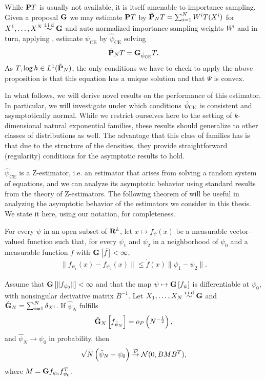 While $\P T$ is usually not available, it is itself amenable to importance sampling. Given a proposal $\G$ we may estimate $\P T$ by $\hat\P_N T = \sum_{i = 1}^{N} W^{i} T(X^{i})$ for $X^{1}, \dots, X^{N} \iid \G$ and auto-normalized importance sampling weights $W^{i}$ and in turn, applying , estimate $\psi_{\text{CE}}$ by $\hat \psi_{\text{CE}}$ solving
$$
\hat \P_N T = \G_{\hpce} T.
$$
As $T, \log h \in L^{1}(\hat \P_{N})$, the only conditions we have to check to apply the above proposition is that this equation has a unique solution and that $\Psi$ is convex. 

In what follows, we will derive novel results on the performance of this estimator. In particular, we will investigate under which conditions $\hpce$ is consistent and asymptotically normal. While we restrict ourselves here to the setting of $k$-dimensional natural exponential families, these results should generalize to other classes of distributions as well. The advantage that this class of families has is that due to the structure of the densities, they provide straightforward (regularity) conditions for the asymptotic results to hold.

$\hat\psi_{\text{CE}}$ is a Z-estimator, i.e. an estimator that arises from solving a random system of equations, and we can analyze its asymptotic behavior using standard results from the theory of Z-estimators. 
The following theorem of \citep{VanderVaart2000Asymptotic} will be useful in analyzing the asymptotic behavior of the estimators we consider in this thesis. We state it here, using our notation, for completeness.

\begin{theorem}
    \label{thm:clt_z_est_vdv}
    For every $\psi$ in an open subset of $\R^{k}$, let $x \mapsto f_{\psi}(x)$ be a measurable vector-valued function such that, for every $\psi_{1}$ and $\psi_{2}$ in a neighborhood of $\psi_{0}$ and a measurable function $\dot f$ with $\G \left[\dot f\right] < \infty$,
    \begin{align}
    \label{eq:clt-vdv-local-lipschitz}
    \lVert f_{\psi_{1}}(x) - f_{\psi_{2}}(x)\rVert \leq \dot f(x) \lVert \psi_{1} - \psi_{2}\rVert \tag{LL}.
    \end{align}

    Assume that $\G \left[\lVert f_{\psi_{0}}\rVert \right] < \infty$ and that the map $\psi \mapsto \G \left[f_{\psi}\right]$ is differentiable at $\psi_{0}$, with nonsingular derivative matrix $B^{-1}$. Let $X_{1}, \dots, X_{N} \iid \G$ and $\hat \G_{N} = \sum_{i = 1}^{N} \delta_{X^{i}}$. If $\hat\psi_{N}$ fulfills $$\hat\G_{N} \left[f_{\hat\psi_{N}}\right] = o_{P} \left( N^{-\frac{1}{2}} \right),$$ and $\hat\psi_{N} \to \psi_{0}$ in probability, then
    \begin{align}
        \label{eq:clt-vdv}
        \sqrt{N} \left( \hat\psi_{N} - \psi_{0} \right) \Dto \mathcal N(0, BMB^{T}),
    \end{align}
    where $M = \G f_{\psi_{0}} f_{\psi_{0}}^{T}$.
\end{theorem}

